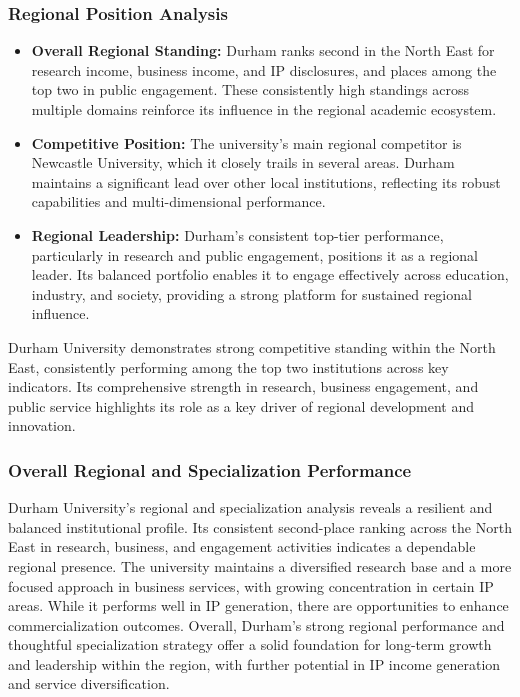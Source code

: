 \documentclass[journal,onecolumn, 10pt,draftclsnofoot]{IEEEtran}
\begin{document}
\subsubsection{Regional Position Analysis}

\begin{itemize}
    \item \textbf{Overall Regional Standing:} Durham ranks second in the North East for research income, business income, and IP disclosures, and places among the top two in public engagement. These consistently high standings across multiple domains reinforce its influence in the regional academic ecosystem.
    
    \item \textbf{Competitive Position:} The university's main regional competitor is Newcastle University, which it closely trails in several areas. Durham maintains a significant lead over other local institutions, reflecting its robust capabilities and multi-dimensional performance.
    
    \item \textbf{Regional Leadership:} Durham's consistent top-tier performance, particularly in research and public engagement, positions it as a regional leader. Its balanced portfolio enables it to engage effectively across education, industry, and society, providing a strong platform for sustained regional influence.
\end{itemize}

Durham University demonstrates strong competitive standing within the North East, consistently performing among the top two institutions across key indicators. Its comprehensive strength in research, business engagement, and public service highlights its role as a key driver of regional development and innovation.

\subsubsection{Overall Regional and Specialization Performance}

Durham University's regional and specialization analysis reveals a resilient and balanced institutional profile. Its consistent second-place ranking across the North East in research, business, and engagement activities indicates a dependable regional presence. The university maintains a diversified research base and a more focused approach in business services, with growing concentration in certain IP areas. While it performs well in IP generation, there are opportunities to enhance commercialization outcomes. Overall, Durham's strong regional performance and thoughtful specialization strategy offer a solid foundation for long-term growth and leadership within the region, with further potential in IP income generation and service diversification.
\end{document}

